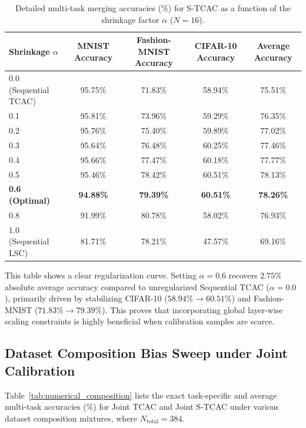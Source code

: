 \documentclass{article}
\theoremstyle{plain}
\theoremstyle{definition}
\theoremstyle{remark}
\begin{document}
\begin{table}[ht]
\caption{Detailed multi-task merging accuracies (\%) for S-TCAC as a function of the shrinkage factor $\alpha$ ($N=16$).}
\label{tab:numerical_ablation}
\vskip 0.15in
\begin{center}
\begin{small}
\begin{sc}
\begin{tabular}{lcccc}
\toprule
Shrinkage $\alpha$ & MNIST Accuracy & Fashion-MNIST Accuracy & CIFAR-10 Accuracy & Average Accuracy \\
\midrule
0.0 (Sequential TCAC) & 95.75\% & 71.83\% & 58.94\% & 75.51\% \\
0.1 & 95.81\% & 73.96\% & 59.29\% & 76.35\% \\
0.2 & 95.76\% & 75.40\% & 59.89\% & 77.02\% \\
0.3 & 95.64\% & 76.48\% & 60.25\% & 77.46\% \\
0.4 & 95.66\% & 77.47\% & 60.18\% & 77.77\% \\
0.5 & 95.46\% & 78.42\% & 60.51\% & 78.13\% \\
\textbf{0.6 (Optimal)} & \textbf{94.88\%} & \textbf{79.39\%} & \textbf{60.51\%} & \textbf{78.26\%} \\
0.8 & 91.99\% & 80.78\% & 58.02\% & 76.93\% \\
1.0 (Sequential LSC) & 81.71\% & 78.21\% & 47.57\% & 69.16\% \\
\bottomrule
\end{tabular}
\end{sc}
\end{small}
\end{center}
\vskip -0.1in
\end{table}

This table shows a clear regularization curve. Setting $\alpha=0.6$ recovers $2.75\%$ absolute average accuracy compared to unregularized Sequential TCAC ($\alpha=0.0$), primarily driven by stabilizing CIFAR-10 ($58.94\% \to 60.51\%$) and Fashion-MNIST ($71.83\% \to 79.39\%$). This proves that incorporating global layer-wise scaling constraints is highly beneficial when calibration samples are scarce.

\subsection{Dataset Composition Bias Sweep under Joint Calibration}
Table~\ref{tab:numerical_composition} lists the exact task-specific and average multi-task accuracies (\%) for Joint TCAC and Joint S-TCAC under various dataset composition mixtures, where $N_{\text{total}} = 384$.
\end{document}
